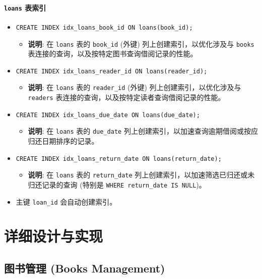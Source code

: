 \documentclass[11pt, a4paper]{article}
\begin{document}
\paragraph{\texttt{loans} 表索引}
\begin{itemize}
    \item \texttt{CREATE INDEX idx\_loans\_book\_id ON loans(book\_id);}
    \begin{itemize}
        \item \textbf{说明}: 在 \texttt{loans} 表的 \texttt{book\_id} (外键) 列上创建索引，以优化涉及与 \texttt{books} 表连接的查询，以及按特定图书查询借阅记录的性能。
    \end{itemize}
    \item \texttt{CREATE INDEX idx\_loans\_reader\_id ON loans(reader\_id);}
    \begin{itemize}
        \item \textbf{说明}: 在 \texttt{loans} 表的 \texttt{reader\_id} (外键) 列上创建索引，以优化涉及与 \texttt{readers} 表连接的查询，以及按特定读者查询借阅记录的性能。
    \end{itemize}
    \item \texttt{CREATE INDEX idx\_loans\_due\_date ON loans(due\_date);}
    \begin{itemize}
        \item \textbf{说明}: 在 \texttt{loans} 表的 \texttt{due\_date} 列上创建索引，以加速查询逾期借阅或按应归还日期排序的记录。
    \end{itemize}
    \item \texttt{CREATE INDEX idx\_loans\_return\_date ON loans(return\_date);}
    \begin{itemize}
        \item \textbf{说明}: 在 \texttt{loans} 表的 \texttt{return\_date} 列上创建索引，以加速筛选已归还或未归还记录的查询 (特别是 \texttt{WHERE return\_date IS NULL})。
    \end{itemize}
    \item 主键 \texttt{loan\_id} 会自动创建索引。
\end{itemize}

\newpage
\section{详细设计与实现}

\subsection{图书管理 (Books Management)}
\end{document}
